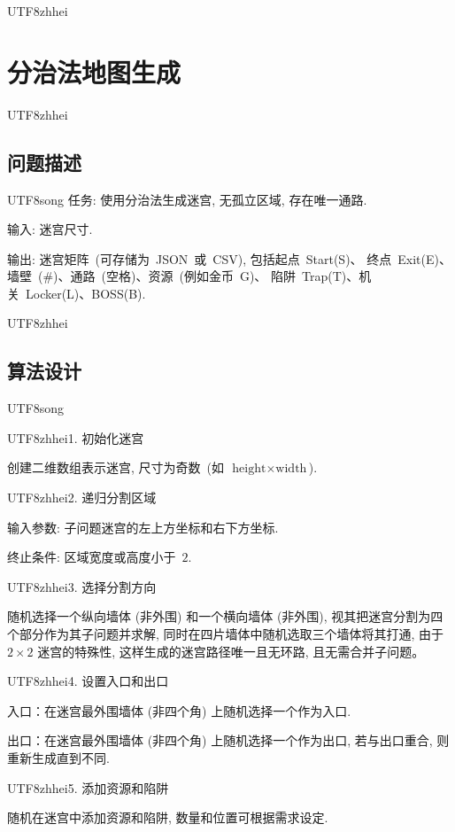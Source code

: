 \documentclass[10.5pt,compsoc]{CjC}
\theoremstyle{mystyle}
\begin{document}
\begin{CJK*}{UTF8}{zhhei}
\vskip 1mm
\section{分治法地图生成}
\end{CJK*}


\begin{CJK*}{UTF8}{zhhei}\subsection{问题描述}\end{CJK*}

\begin{CJK*}{UTF8}{song}
任务: 使用分治法生成迷宫, 无孤立区域, 存在唯一通路.

输入: 迷宫尺寸.

输出: 迷宫矩阵~(可存储为~JSON~或~CSV), 包括起点~Start(S)、
终点~Exit(E)、墙壁~(\#)、通路~(空格)、资源~(例如金币~G)、
陷阱~Trap(T)、机关~Locker(L)、BOSS(B).
\end{CJK*}

\begin{CJK*}{UTF8}{zhhei}\subsection{算法设计}\end{CJK*}

\begin{CJK*}{UTF8}{song}
\begin{CJK*}{UTF8}{zhhei}{1. 初始化迷宫}\end{CJK*}

创建二维数组表示迷宫, 尺寸为奇数~(如~$\textrm{height} \times \textrm{width}$).

\begin{CJK*}{UTF8}{zhhei}{2. 递归分割区域}\end{CJK*}

输入参数: 子问题迷宫的左上方坐标和右下方坐标.

终止条件: 区域宽度或高度小于~$2$.

\begin{CJK*}{UTF8}{zhhei}{3. 选择分割方向}\end{CJK*}

随机选择一个纵向墙体 (非外围) 和一个横向墙体 (非外围), 视其把迷宫分割为四个部分作为其子问题并求解,
同时在四片墙体中随机选取三个墙体将其打通, 由于~$2 \times 2$ 迷宫的特殊性,
这样生成的迷宫路径唯一且无环路, 且无需合并子问题。

\begin{CJK*}{UTF8}{zhhei}{4. 设置入口和出口}\end{CJK*}

入口：在迷宫最外围墙体 (非四个角) 上随机选择一个作为入口.

出口：在迷宫最外围墙体 (非四个角) 上随机选择一个作为出口, 若与出口重合, 则重新生成直到不同.

\begin{CJK*}{UTF8}{zhhei}{5. 添加资源和陷阱}\end{CJK*}

随机在迷宫中添加资源和陷阱, 数量和位置可根据需求设定.
\end{CJK*}
\end{document}
